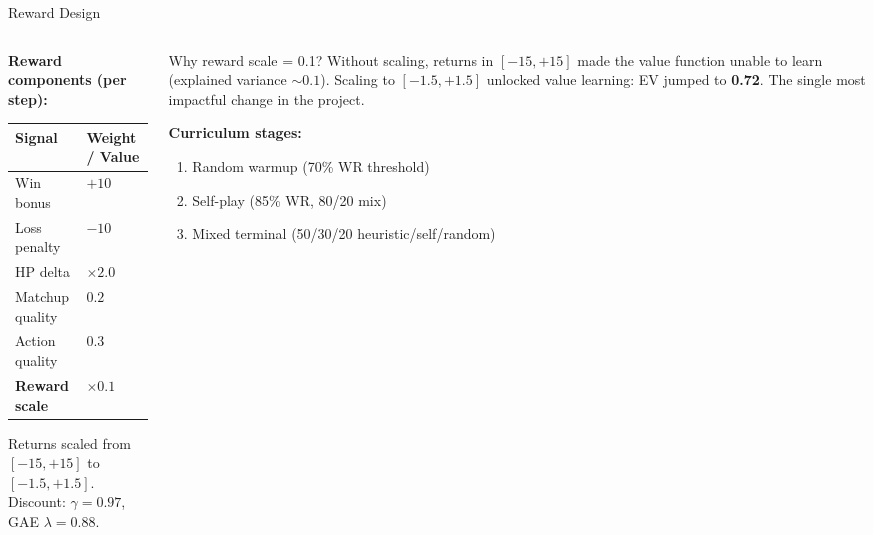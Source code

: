 \documentclass[aspectratio=169, 11pt]{beamer}
\begin{document}
\begin{frame}{Reward Design}
  \begin{columns}[T]
    \begin{column}{0.48\textwidth}
      \textbf{Reward components (per step):}
      \begin{center}
        \small
        \begin{tabularx}{\textwidth}{l X}
          \toprule
          \textbf{Signal} & \textbf{Weight / Value} \\
          \midrule
          Win bonus         & $+10$ \\
          Loss penalty      & $-10$ \\
          HP delta          & $\times 2.0$ \\
          Matchup quality   & $0.2$ \\
          Action quality    & $0.3$ \\
          \midrule
          \textbf{Reward scale} & $\mathbf{\times 0.1}$ \\
          \bottomrule
        \end{tabularx}
      \end{center}

      \vspace{0.3em}
      \small
      Returns scaled from $[-15, +15]$ to $[-1.5, +1.5]$.\\
      Discount: $\gamma = 0.97$, GAE $\lambda = 0.88$.
    \end{column}

    \begin{column}{0.48\textwidth}
      \begin{exampleblock}{Why reward scale = 0.1?}
        Without scaling, returns in $[-15, +15]$ made the value function
        unable to learn (explained variance $\sim 0.1$).
        Scaling to $[-1.5, +1.5]$ unlocked value learning: EV jumped to
        \textbf{0.72}. The single most impactful change in the project.
      \end{exampleblock}

      \vspace{0.3em}
      \textbf{Curriculum stages:}
      \begin{enumerate}\small
        \item Random warmup (70\% WR threshold)
        \item Self-play (85\% WR, 80/20 mix)
        \item Mixed terminal (50/30/20 heuristic/self/random)
      \end{enumerate}
    \end{column}
  \end{columns}
\end{frame}
\end{document}
